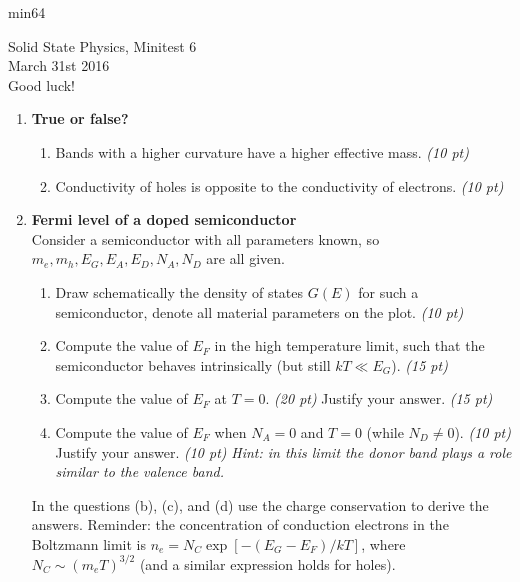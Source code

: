 \documentclass[11pt]{article}
\newcommand{\ben}{\begin{enumerate}}
\newcommand{\een}{\end{enumerate}}
\begin{document}
\begin{exam}{min6}{4}

\begin{center}
\huge
Solid State Physics, Minitest 6\\
\Large
March 31st 2016 \\ 
Good luck! \\[8mm]
\end{center}

\ben
\item {\bf True or false?}
\ben
\item Bands with a higher curvature have a higher effective mass. \emph{(10 pt)}
\item Conductivity of holes is opposite to the conductivity of electrons. \emph{(10 pt)}
\een
\vspace {5mm}

\item {\bf Fermi level of a doped semiconductor}\\
Consider a semiconductor with all parameters known, so $m_e, m_h, E_G, E_A, E_D, N_A, N_D$ are all given.
\ben
\item Draw schematically the density of states $G(E)$ for such a semiconductor, denote all  material parameters on the plot. \emph{(10 pt)}

{\centering\fbox{
	\begin{minipage}{\textwidth}
		\hfill\vspace{3in}
	\end{minipage}
	}}

\item Compute the value of $E_F$ in the high temperature limit, such that the semiconductor behaves intrinsically (but still $kT\ll E_G$). \emph{(15 pt)}
\item Compute the value of $E_F$ at $T=0$. \emph{(20 pt)} Justify your answer. \emph{(15 pt)}
\item Compute the value of $E_F$ when $N_A = 0$ and $T=0$ (while $N_D \neq 0$). \emph{(10 pt)} Justify your answer. \emph{(10 pt)} \emph{Hint: in this limit the donor band plays a role similar to the valence band.}
\een
In the questions (b), (c), and (d) use the charge conservation to derive the answers. Reminder: the concentration of conduction electrons in the Boltzmann limit is $n_e = N_C \exp[-(E_G-E_F)/kT]$, where $N_C \sim (m_e T)^{3/2}$ (and a similar expression holds for holes).

\een
\end{exam}
\end{document}
